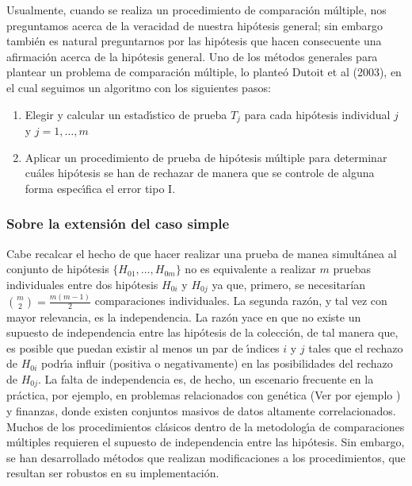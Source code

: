 \documentclass{article}
\theoremstyle{definition}
\begin{document}
Usualmente, cuando se realiza un procedimiento de comparación múltiple, nos preguntamos acerca de la veracidad de nuestra hipótesis general; sin embargo también es natural preguntarnos por las hipótesis que hacen consecuente una afirmación acerca de la hipótesis general. Uno de los métodos generales para plantear un problema de comparación múltiple, lo planteó Dutoit et al (2003), en el cual seguimos un algoritmo con los siguientes pasos:

\begin{enumerate}[I]
	\item Elegir y calcular un estadı́stico de prueba $T_j$ para cada hipótesis individual $j$ y $j=1,\dots,m$
	\item Aplicar un procedimiento de prueba de hipótesis múltiple para determinar cuáles hipótesis se han
	de rechazar de manera que se controle de alguna forma especı́fica el error tipo I.
\end{enumerate}
\subsubsection{Sobre la extensión del caso simple}
Cabe recalcar el hecho de que hacer realizar una prueba de manea simultánea al conjunto de hipótesis $\{H_{01},\dots,H_{0m}\}$ no es equivalente a realizar $m$ pruebas individuales entre dos hipótesis $H_{0i}$ y $H_{0j}$ ya que, primero, se necesitarían ${m\choose2}=\frac{m(m-1)}{2}$ comparaciones individuales. La segunda razón, y tal vez con mayor relevancia, es la independencia.
La razón yace en que no existe un supuesto de
independencia entre las hipótesis de la colección, de tal manera que, es posible que puedan existir al
menos un par de ı́ndices $i$ y $j$ tales que el rechazo de $H_{0i}$ podrı́a influir (positiva o negativamente) en las
posibilidades del rechazo de $H_{0j}$. La falta de independencia es, de hecho, un escenario frecuente en la
práctica, por ejemplo, en problemas relacionados con genética (Ver por ejemplo \cite{Sandrine}%
) y finanzas, donde existen conjuntos masivos
de datos altamente correlacionados. Muchos de los procedimientos clásicos dentro de la metodologı́a de
comparaciones múltiples requieren el supuesto de independencia entre las hipótesis. Sin embargo, se han desarrollado métodos  que realizan modificaciones a los procedimientos, que resultan ser robustos en su implementación.
\end{document}
